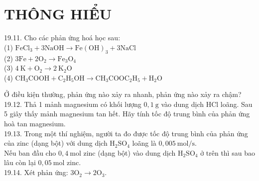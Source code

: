 \documentclass[10pt]{article}
\begin{document}
\section*{THÔNG HIỂU}
19.11. Cho các phản ứng hoá học sau:\\
(1) $\mathrm{FeCl}_{3}+3 \mathrm{NaOH} \rightarrow \mathrm{Fe}(\mathrm{OH})_{3}+3 \mathrm{NaCl}$\\
(2) $3 \mathrm{Fe}+2 \mathrm{O}_{2} \rightarrow \mathrm{Fe}_{3} \mathrm{O}_{4}$\\
(3) $4 \mathrm{~K}+\mathrm{O}_{2} \rightarrow 2 \mathrm{~K}_{2} \mathrm{O}$\\
(4) $\mathrm{CH}_{3} \mathrm{COOH}+\mathrm{C}_{2} \mathrm{H}_{5} \mathrm{OH} \rightarrow \mathrm{CH}_{3} \mathrm{COOC}_{2} \mathrm{H}_{5}+\mathrm{H}_{2} \mathrm{O}$

Ở điều kiện thường, phản ứng nào xảy ra nhanh, phản ứng nào xảy ra chậm?\\
19.12. Thả 1 mảnh magnesium có khối lượng $0,1 \mathrm{~g}$ vào dung dịch HCl loãng. Sau 5 giây thấy mảnh magnesium tan hết. Hãy tính tốc độ trung bình của phản ứng hoà tan magnesium.\\
19.13. Trong một thí nghiệm, người ta đo được tốc độ trung bình của phản ứng của zinc (dạng bột) với dung dịch $\mathrm{H}_{2} \mathrm{SO}_{4}$ loãng là $0,005 \mathrm{~mol} / \mathrm{s}$.\\
Nếu ban đầu cho $0,4 \mathrm{~mol}$ zinc (dạng bột) vào dung dịch $\mathrm{H}_{2} \mathrm{SO}_{4}$ ở trên thì sau bao lâu còn lại $0,05 \mathrm{~mol}$ zinc.\\
19.14. Xét phản ứng: $3 \mathrm{O}_{2} \rightarrow 2 \mathrm{O}_{3}$.
\end{document}
